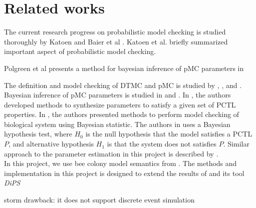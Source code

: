 \chapter{Related works}

The current research progress on probabilistic model checking is studied thoroughly by Katoen and Baier et al \cite{baier2008principles}. Katoen et al. \cite{katoen2016probabilistic} briefly summarized important aspect of probabilistic model checking.

Polgreen et al \cite{polgreen2016data} presents a method for bayesian inference of pMC parameters in


The definition and model checking of DTMC and pMC is studied by
\cite{baier2008principles}, \cite{hutschenreiter2017parametric}, and \cite{katoen2016probabilistic}.\\
Bayesian inference of pMC parameters is studied in \cite{polgreen2016data} and
\cite{jha2009bayesian}. In \cite{polgreen2016data}, the authors developed
methods to synthesize parameters to satisfy a given set of PCTL properties. In
\cite{jha2009bayesian}, the authors presented methods to perform model checking
of biological system using Bayesian statistic. The authors in
\cite{jha2009bayesian} uses a Bayesian hypothesis test, where $H_0$ is the null
hypothesis that the model satisfies a PCTL $P$, and alternative hypothesis $H_1$
is that the system does not satisfies $P$. Similar approach to the parameter
estimation in this project is described by \cite{hussain2015automated}.\\
In this project, we use bee colony model semantics from \cite{hajnal2019data}.
The methods and implementation in this project is designed to extend the results
of \cite{hajnal2019data} and its tool \textit{DiPS} \cite{molyneux2020abc}

storm drawback: it does not support discrete event simulation